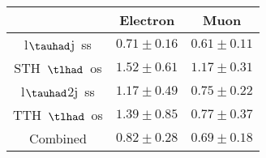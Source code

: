 \centering
\begin{tabular}{|c|c|c|} \hline
 & Electron & Muon\\\hline
l$\tauhad$j~ss & $0.71\pm0.16$ & $0.61\pm0.11$\\\hline
STH~$\tlhad$~os & $1.52\pm0.61$ & $1.17\pm0.31$\\\hline
l$\tauhad$2j~ss & $1.17\pm0.49$ & $0.75\pm0.22$\\\hline
TTH~$\tlhad$~os & $1.39\pm0.85$ & $0.77\pm0.37$\\\hline
Combined & $0.82\pm0.28$ & $0.69\pm0.18$\\\hline
\end{tabular}
